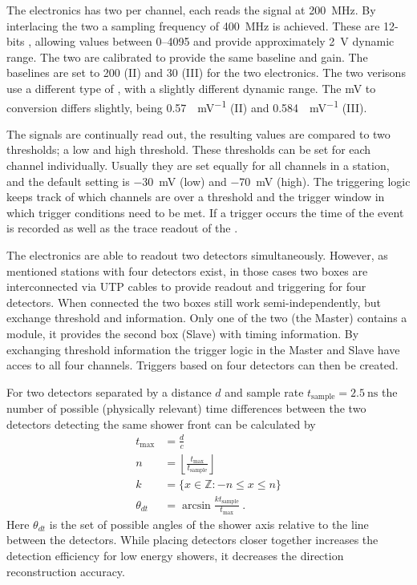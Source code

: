 The \hisparc electronics has two \adcs per channel, each reads the \pmt signal at \SI{200}{\mega\hertz}. By interlacing the two \adcs a sampling frequency of \SI{400}{\mega\hertz} is achieved. These are 12-bits \adcs, allowing values between \SIrange{0}{4095}{\adc} and provide approximately \SI{2}{\volt} dynamic range. The two \adcs are calibrated to provide the same baseline and gain. The baselines are set to \SI{200}{\adc} (II) and \SI{30}{\adc} (III) for the two \hisparc electronics. The two verisons use a different type of \adc, with a slightly different dynamic range. The \si{\mV} to \si{\adc} conversion differs slightly, being \SI{0.57}{\adc\per\mV} (II) and \SI{0.584}{\adc\per\mV} (III).

The \pmt signals are continually read out, the resulting \adc values are compared to two thresholds; a low and high threshold. These thresholds can be set for each channel individually. Usually they are set equally for all channels in a station, and the default setting is \SI{-30}{\milli\volt} (low) and \SI{-70}{\milli\volt} (high). The triggering logic keeps track of which channels are over a threshold and the trigger window in which trigger conditions need to be met. If a trigger occurs the time of the event is recorded as well as the trace readout of the \adc.

The \hisparc electronics are able to readout two detectors simultaneously. However, as mentioned stations with four detectors exist, in those cases two boxes are interconnected via UTP cables to provide readout and triggering for four detectors. When connected the two boxes still work semi-independently, but exchange threshold and \gps information. Only one of the two (the Master) contains a \gps module, it provides the second box (Slave) with \gps timing information. By exchanging threshold information the trigger logic in the Master and Slave have acces to all four channels. Triggers based on four detectors can then be created.

For two detectors separated by a distance $d$ and sample rate $t_{\mathrm{sample}} = \SI{2.5}{\ns}$ the number of possible (physically relevant) time differences between the two detectors detecting the same shower front can be calculated by
%
\begin{equation}
    \begin{split}
        t_{\mathrm{max}} &= \frac{d}{c} \\
        n &= \left\lfloor \frac{t_{\mathrm{max}}}{t_{\mathrm{sample}}} \right\rfloor \\
        k &= \{x \in \mathbb{Z} : -n \leq x \leq n \} \\
        \theta_{dt} &= \arcsin \frac{k t_{\mathrm{sample}}}{t_{\mathrm{max}}} \ .
    \end{split}
\end{equation}
%
Here $\theta_{dt}$ is the set of possible angles of the shower axis relative to the line between the detectors. While placing detectors closer together increases the detection efficiency for low energy showers, it decreases the direction reconstruction accuracy.

